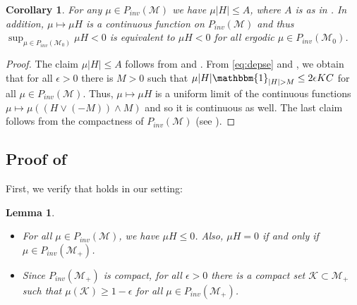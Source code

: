 \documentclass[final]{amsart}
\newtheorem{lem}[thm]{Lemma}
\newtheorem{cor}[thm]{Corollary}
\numberwithin{thm}{section}
\numberwithin{equation}{section}
\newcommand{\mcM}{\mathcal{M}}
\newcommand{\Id}{\mathbbm{1}}
\newcommand{\inv}{\mathcal{M}_+}
\newcommand{\K}{\mathcal{K}}
\begin{document}
\begin{cor}\label{H-in-L1}
For any $\mu \in P_{inv}(\mcM)$ we have $\mu |H| \leq A$, where $A$ is as in .  In addition, $\mu \mapsto \mu H$ is a continuous 
function on $P_{inv}(\mcM)$ and thus $\sup_{\mu \in P_{inv}
(\mcM_0)}\mu H < 0$ is equivalent to $\mu H < 0$ for all ergodic 
$\mu \in P_{inv}(\mcM_0)$.
\end{cor}
\begin{proof}
   The claim $\mu |H| \leq A$ follows from  and . From \eqref{eq:depse} and , we obtain that for all $\epsilon > 0$ there is $M > 0$ such that $\mu |H|\Id_{|H| > M} \leq 2\epsilon KC$ for all $\mu \in P_{inv}(\mcM)$. Thus, $\mu \mapsto \mu H$ is a uniform limit of the continuous functions $\mu \mapsto \mu ((H\vee(-M)) \wedge M)$ and so it is continuous as well. The last claim follows from the compactness of $P_{inv}(\mcM)$ (see ). \end{proof}
\subsection{Proof of }
First, we verify that \cite[Proposition 4.6]{persistence} holds in our setting:
\begin{lem}\label{muH-neg}
     \begin{itemize}
         \item For all $\mu \in P_{inv}(\mcM)$, we have $\mu H \leq 0$. Also, $\mu H = 0$ if and only if  $\mu \in P_{inv}(\inv)$.
         \item Since $P_{inv}(\inv)$ is compact, for all $\epsilon > 0$ there is a compact set $\K \subset \inv$ such that $\mu(\K) \geq 1 - \epsilon$ for all $\mu \in P_{inv}(\inv)$.
     \end{itemize}
\end{lem}
\end{document}
